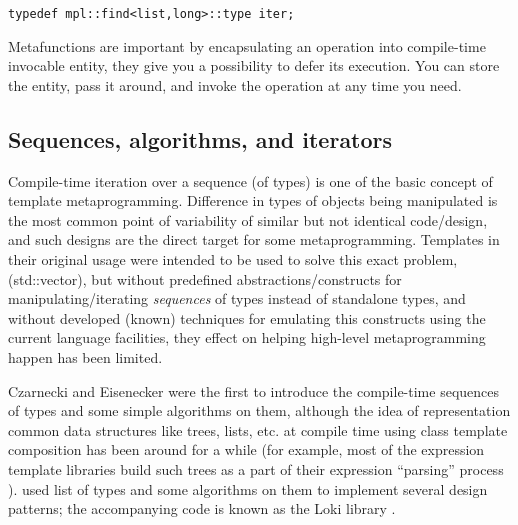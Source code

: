 \documentclass{kapproc}
\newcommand{\Mpl}{Boost Meta\-pro\-gram\-ming Library}
\begin{document}
{\small
\begin{codesamp}\begin{verbatim}
typedef mpl::find<list,long>::type iter;
\end{verbatim}
\end{codesamp}
}


Metafunctions are important by encapsulating an operation into 
compile-time invocable entity, they give you a possibility to 
defer its execution. You can store the entity, pass it around, 
and invoke the operation at any time you need.

\subsection{Sequences, algorithms, and iterators}

Compile-time iteration over a sequence (of types) is one of 
the basic concept of template metaprogramming. Difference in 
types of objects being manipulated is the most common point 
of variability of similar but not identical code/design, and 
such designs are the direct target for some metaprogramming. 
Templates in their original usage were intended to be used to 
solve this exact problem, (std::vector), but without predefined 
abstractions/constructs for manipulating/iterating 
\emph{sequences} of types instead of standalone types, and 
without developed (known) techniques for emulating this 
constructs using the current language facilities, they effect 
on helping high-level metaprogramming happen has been limited. 

Czarnecki and Eisenecker \cite{CE00} were the first to introduce 
the compile-time sequences of types and some simple algorithms 
on them, although the idea of representation common data 
structures like trees, lists, etc. at compile time using class 
template composition has been around for a while (for example, 
most of the expression template libraries build such trees as 
a part of their expression ``parsing'' process \cite{Vel95b}). 
\cite{Ale00} used list of types and some algorithms on them to 
implement several design patterns; the accompanying code 
is known as the Loki library \cite{}. 


\end{document}
